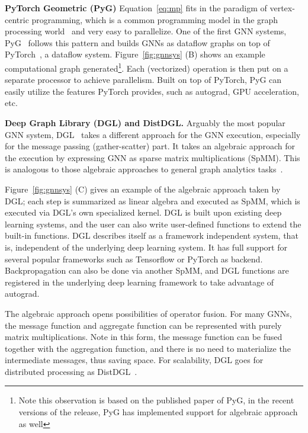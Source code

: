 \vspace{2mm}
\noindent \textbf{PyTorch Geometric (PyG)}  
Equation~\ref{eq:mp} fits in the paradigm of vertex-centric programming, which is a common programming model in the graph processing world~\cite{vertexcentric, powergraph, pregel} and very easy to parallelize. One of the first GNN systems, PyG~\cite{pyg} follows this pattern and builds GNNs as dataflow graphs on top of PyTorch~\cite{torch}, a dataflow system. Figure~\ref{fig:gnnsys} (B) shows an example computational graph generated\footnote{Note this observation is based on the published paper of PyG, in the recent versions of the release, PyG has implemented support for algebraic approach as well}. Each (vectorized) operation is then put on a separate processor to achieve parallelism. Built on top of PyTorch, PyG can easily utilize the features PyTorch provides, such as autograd, GPU acceleration, etc. 

\vspace{2mm}
\noindent \textbf{Deep Graph Library (DGL) and DistDGL.}  
Arguably the most popular GNN system, DGL~\cite{dgl} takes a different approach for the GNN execution, especially for the message passing (gather-scatter) part. It takes an algebraic approach for the execution by expressing GNN as sparse matrix multiplications (SpMM). This is analogous to those algebraic approaches to general graph analytics tasks~\cite{graphla}.

Figure~\ref{fig:gnnsys} (C) gives an example of the algebraic approach taken by DGL; each step is summarized as linear algebra and executed as SpMM, which is executed via DGL's own specialized kernel. DGL is built upon existing deep learning systems, and the user can also write user-defined functions to extend the built-in functions. DGL describes itself as a framework independent system, that is, independent of the underlying deep learning system. It has full support for several popular frameworks such as Tensorflow or PyTorch as backend. Backpropagation can also be done via another SpMM, and DGL functions are registered in the underlying deep learning framework to take advantage of autograd.

The algebraic approach opens possibilities of operator fusion. For many GNNs, the message function and aggregate function can be represented with purely matrix multiplications. Note in this form, the message function can be fused together with the aggregation function, and there is no need to materialize the intermediate messages, thus saving space. For scalability, DGL goes for distributed processing as DistDGL~\cite{distdgl}.

